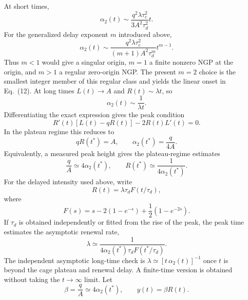 \documentclass[aps,preprint,onecolumn,superscriptaddress,nofootinbib]{revtex4-2}
\begin{document}
At short times,
\begin{equation}
  \alpha_2(t)\sim
  \frac{q^2\lambda\tau_c^2}{3A^2\tau_d^2}t.
\end{equation}
For the generalized delay exponent $m$ introduced above,
\begin{equation}
  \alpha_2(t)\sim
  \frac{q^2\lambda\tau_c^2}{(m+1)A^2\tau_d^m}t^{m-1}.
\end{equation}
Thus $m<1$ would give a singular origin, $m=1$ a finite nonzero NGP at the
origin, and $m>1$ a regular zero-origin NGP. The present $m=2$ choice is the
smallest integer member of this regular class and yields the linear onset in
Eq.~(12).
At long times $L(t)\to A$ and $R(t)\sim \lambda t$, so
\begin{equation}
  \alpha_2(t)\sim \frac{1}{\lambda t}.
\end{equation}
Differentiating the exact expression gives the peak condition
\begin{equation}
  R'(t)\left[L(t)-qR(t)\right]-2R(t)L'(t)=0.
\end{equation}
In the plateau regime this reduces to
\begin{equation}
  qR(t^\ast)=A,\qquad \alpha_2(t^\ast)=\frac{q}{4A}.
\end{equation}
Equivalently, a measured peak height gives the plateau-regime estimates
\begin{equation}
  \frac{q}{A}\simeq 4\alpha_2(t^\ast),\qquad
  R(t^\ast)\simeq \frac{1}{4\alpha_2(t^\ast)}.
\end{equation}
For the delayed intensity used above, write
\begin{equation}
  R(t)=\lambda\tau_d F(t/\tau_d),
\end{equation}
where
\begin{equation}
  F(s)=s-2(1-e^{-s})+\frac{1}{2}(1-e^{-2s}).
\end{equation}
If $\tau_d$ is obtained independently or fitted from the rise of the peak, the
peak time estimates the asymptotic renewal rate,
\begin{equation}
  \lambda \simeq
  \frac{1}{4\alpha_2(t^\ast)\tau_d F(t^\ast/\tau_d)}.
\end{equation}
The independent asymptotic long-time check is
$\lambda\simeq[t\,\alpha_2(t)]^{-1}$ once $t$ is beyond the cage plateau and
renewal delay. A finite-time version is obtained without taking the
$t\to\infty$ limit. Let
\begin{equation}
  \beta=\frac{q}{A}\simeq 4\alpha_2(t^\ast),\qquad y(t)=\beta R(t).
\end{equation}
\end{document}
